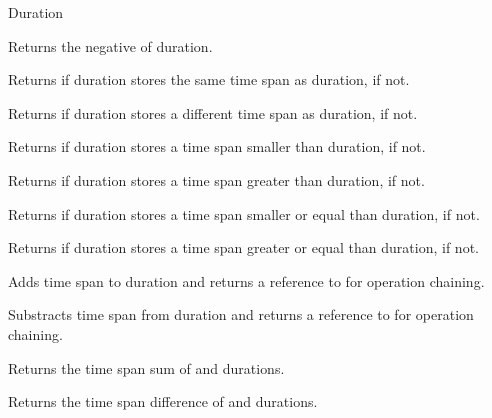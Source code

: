 \begin{classpage}{Duration}
\begin{mandescription}
  Returns the negative of  duration.
  
  Returns  if  duration stores the same time span as  duration,  if not.

  Returns  if  duration stores a different time span as  duration,  if not.
  
  Returns  if  duration stores a time span smaller than  duration,  if not.

  Returns  if  duration stores a time span greater than  duration,  if not.

  Returns  if  duration stores a time span smaller or equal than  duration,  if not.

  Returns  if  duration stores a time span greater or equal than  duration,  if not.
  
  Adds  time span to  duration and returns a reference to  for operation chaining.
  
  Substracts  time span from  duration and returns a reference to  for operation chaining.
  
  Returns the time span sum of  and  durations.

  Returns the time span difference of  and  durations.
\end{mandescription}

\end{classpage}
